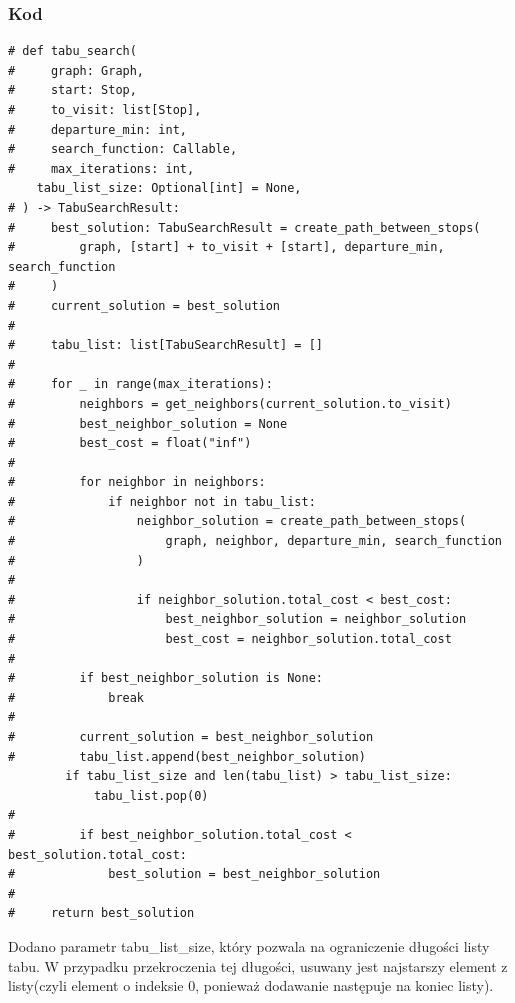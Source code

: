 \documentclass[a4paper, 12pt]{article}
\begin{document}
    \subsubsection{Kod}
\begin{lstlisting}
# def tabu_search(
#     graph: Graph,
#     start: Stop,
#     to_visit: list[Stop],
#     departure_min: int,
#     search_function: Callable,
#     max_iterations: int,
    tabu_list_size: Optional[int] = None,
# ) -> TabuSearchResult:
#     best_solution: TabuSearchResult = create_path_between_stops(
#         graph, [start] + to_visit + [start], departure_min, search_function
#     )
#     current_solution = best_solution
# 
#     tabu_list: list[TabuSearchResult] = []
# 
#     for _ in range(max_iterations):
#         neighbors = get_neighbors(current_solution.to_visit)
#         best_neighbor_solution = None
#         best_cost = float("inf")
# 
#         for neighbor in neighbors:
#             if neighbor not in tabu_list:
#                 neighbor_solution = create_path_between_stops(
#                     graph, neighbor, departure_min, search_function
#                 )
# 
#                 if neighbor_solution.total_cost < best_cost:
#                     best_neighbor_solution = neighbor_solution
#                     best_cost = neighbor_solution.total_cost
# 
#         if best_neighbor_solution is None:
#             break
# 
#         current_solution = best_neighbor_solution
#         tabu_list.append(best_neighbor_solution)
        if tabu_list_size and len(tabu_list) > tabu_list_size:
            tabu_list.pop(0)
# 
#         if best_neighbor_solution.total_cost < best_solution.total_cost:
#             best_solution = best_neighbor_solution
# 
#     return best_solution
\end{lstlisting}
Dodano parametr tabu\_list\_size, który pozwala na ograniczenie długości listy tabu.
W przypadku przekroczenia tej długości, usuwany jest najstarszy element z listy(czyli element o indeksie 0, 
ponieważ dodawanie następuje na koniec listy).



  
\end{document}
